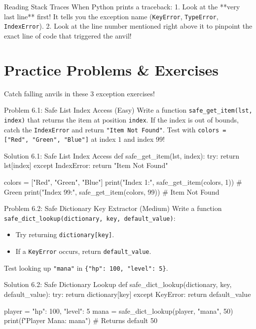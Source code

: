 \begin{snakesnack}{Reading Stack Traces}
When Python prints a traceback:
1. Look at the **very last line** first! It tells you the exception name (\texttt{KeyError}, \texttt{TypeError}, \texttt{IndexError}).
2. Look at the line number mentioned right above it to pinpoint the exact line of code that triggered the anvil!
\end{snakesnack}

\section{Practice Problems \& Exercises}

Catch falling anvils in these 3 exception exercises!

\begin{snakelab}{Problem 6.1: Safe List Index Access (Easy)}
Write a function \texttt{safe\_get\_item(lst, index)} that returns the item at position \texttt{index}.
If the index is out of bounds, catch the \texttt{IndexError} and return \texttt{"Item Not Found"}.
Test with \texttt{colors = ["Red", "Green", "Blue"]} at index $1$ and index $99$!
\end{snakelab}

\begin{pycode}{Solution 6.1: Safe List Index Access}
def safe_get_item(lst, index):
    try:
        return lst[index]
    except IndexError:
        return "Item Not Found"

colors = ["Red", "Green", "Blue"]
print("Index 1:", safe_get_item(colors, 1))   # Green
print("Index 99:", safe_get_item(colors, 99)) # Item Not Found
\end{pycode}

\begin{snakelab}{Problem 6.2: Safe Dictionary Key Extractor (Medium)}
Write a function \texttt{safe\_dict\_lookup(dictionary, key, default\_value)}:
\begin{itemize}
    \item Try returning \texttt{dictionary[key]}.
    \item If a \texttt{KeyError} occurs, return \texttt{default\_value}.
\end{itemize}
Test looking up \texttt{"mana"} in \texttt{\{"hp": 100, "level": 5\}}.
\end{snakelab}

\begin{pycode}{Solution 6.2: Safe Dictionary Lookup}
def safe_dict_lookup(dictionary, key, default_value):
    try:
        return dictionary[key]
    except KeyError:
        return default_value

player = {"hp": 100, "level": 5}
mana = safe_dict_lookup(player, "mana", 50)
print(f"Player Mana: {mana}") # Returns default 50
\end{pycode}

